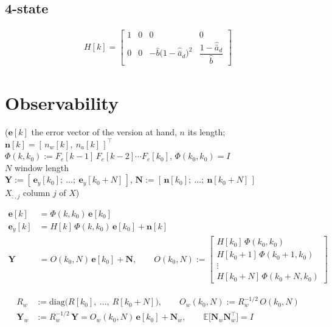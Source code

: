 \documentclass[11pt,a4paper,fontset=none]{ctexart}
\newcommand{\ba}{\bar{a}}
\newcommand{\bh}{\hat{b}}
\newcommand{\ad}{\hat{\ba}_d}
\newcommand{\E}{\mathbb{E}}
\begin{document}
\subsection*{4-state}

\begin{align*}
H[k] = \begin{bmatrix}
1 & 0 & 0 & 0 \\[2pt]
0 & 0 & -\bh\bigl(1-\ad\bigr)^{2} & \dfrac{1-\ad}{\bh}
\end{bmatrix}
\end{align*}

\clearpage
\section{Observability}

($\mathbf{e}[k]$ the error vector of the version at hand, $n$ its length;
$\mathbf{n}[k] = [\,n_w[k],\ n_a[k]\,]^{\top}$ \\
$\Phi(k,k_0) := F_e[k-1]\,F_e[k-2]\cdots F_e[k_0]$, $\Phi(k_0,k_0) = I$ \\
$N$ window length \\
$\mathbf{Y} := [\,\mathbf{e}_y[k_0];\ \dots;\ \mathbf{e}_y[k_0+N]\,]$,
$\mathbf{N} := [\,\mathbf{n}[k_0];\ \dots;\ \mathbf{n}[k_0+N]\,]$ \\
$X_{:,j}$ column $j$ of $X$)

\begin{align*}
\mathbf{e}[k]   &= \Phi(k,k_0)\,\mathbf{e}[k_0] \\
\mathbf{e}_y[k] &= H[k]\,\Phi(k,k_0)\,\mathbf{e}[k_0] + \mathbf{n}[k] \\
\mathbf{Y}      &= O(k_0,N)\,\mathbf{e}[k_0] + \mathbf{N}, \qquad
O(k_0,N) := \begin{bmatrix} H[k_0]\,\Phi(k_0,k_0) \\ H[k_0+1]\,\Phi(k_0+1,k_0) \\ \vdots \\ H[k_0+N]\,\Phi(k_0+N,k_0) \end{bmatrix}
\end{align*}

\begin{align*}
R_w &:= \mathrm{diag}\bigl(R[k_0],\ \dots,\ R[k_0+N]\bigr), \qquad
O_w(k_0,N) := R_w^{-1/2}\,O(k_0,N) \\
\mathbf{Y}_w &:= R_w^{-1/2}\,\mathbf{Y} = O_w(k_0,N)\,\mathbf{e}[k_0] + \mathbf{N}_w, \qquad
\E\bigl[\mathbf{N}_w\mathbf{N}_w^{\top}\bigr] = I
\end{align*}
\end{document}
